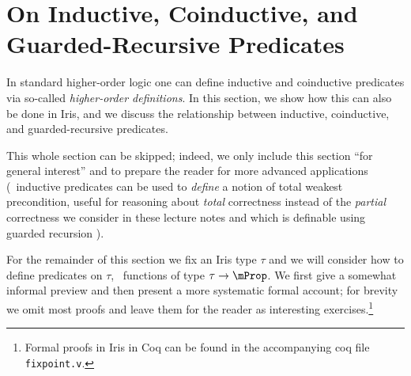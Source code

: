 
\section{On Inductive, Coinductive, and Guarded-Recursive Predicates}
\label{sec:inductive-coinductive-predicates}


In standard higher-order logic one can define inductive and coinductive predicates
via so-called \emph{higher-order definitions}. In this section, we show how this can also be done
in Iris, and we discuss the relationship between inductive, coinductive, and guarded-recursive predicates.

This whole section can be skipped; indeed, we only include this section ``for general interest'' and to prepare the reader for more advanced
applications (\eg\ inductive predicates can be used to \emph{define} a notion of total weakest precondition,
useful for reasoning about \emph{total} correctness instead of the \emph{partial} correctness we consider
in these lecture notes and which is definable using guarded recursion \cite{iris-ground-up}).

For the remainder of this section we fix an Iris type $\tau$ and we will consider how to define predicates
on $\tau$, \ie\ functions of type $\tau\to\Prop$. We first give a somewhat informal preview and then
present a more systematic formal account; for brevity we omit most proofs and leave them for the reader
as interesting exercises.\footnote{Formal proofs in Iris in Coq can be found in the accompanying coq file \texttt{fixpoint.v}.}

